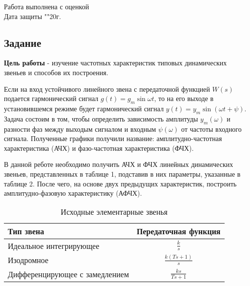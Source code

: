 \documentclass[a4paper, 12pt]{article}
\begin{document}
\begin{titlepage}
	Работа выполнена с оценкой \hspace{1cm} \underline{\hspace{8cm}} \\ 
	\vspace{1cm}
	Дата защиты "\underline{\hspace{0.7cm}}"\hspace{0.2cm}\underline{\hspace{2cm}}\hspace{0.2cm}20\underline{\hspace{0.7cm}}г.
	
\end{titlepage}

\begin{center}
	\section*{Задание}
\end{center}
\textbf{Цель работы} - изучение частотных характеристик типовых динамических звеньев и способов их построения. \par
Если на вход устойчивого линейного звена с передаточной функцией $W(s)$ подается гармонический сигнал $g(t) = g_m\sin{\omega t}$, то на его выходе в установившемся режиме будет гармонический сигнал $y(t) = y_m\sin{(\omega t + \psi)}$. Задача состоим в том, чтобы определить зависимость амплитуды $y_m(\omega)$ и разности фаз между выходым сигналом и входным $\psi(\omega)$ от частоты входного сигнала. Полученные графики получили название: амплитудно-частотная характеристика (АЧХ) и фазо-частотная характеристика (ФЧХ). \par
В данной реботе необходимо получить АЧХ и ФЧХ линейных динамических звеньев, представленных в таблице 1, подставив в них параметры, указанные в таблице 2. После чего, на основе двух предыдущих характеристик, построить амплитудно-фазовую характеристику (АФЧХ).

\begin{table}[h!]
	\centering
	\begin{threeparttable}
		\caption{Исходные элементарные звенья}
		\begin{tabular} {|l|c|}
			\hline
			Тип звена & Передаточная функция \\ [0.5cm]  \hline
			Идеальное интегрирующее    & $\displaystyle\frac{k}{s}$ \\ [0.5cm]  \hline
			Изодромное & $\displaystyle\frac{k(Ts + 1)}{s}$ \\ [0.5cm]  \hline
			Дифференцирующее с замедлением & $\displaystyle\frac{ks}{Ts + 1}$ \\ [0.5cm] \hline
		\end{tabular}
	\end{threeparttable} 
\end{table}
\end{document}
